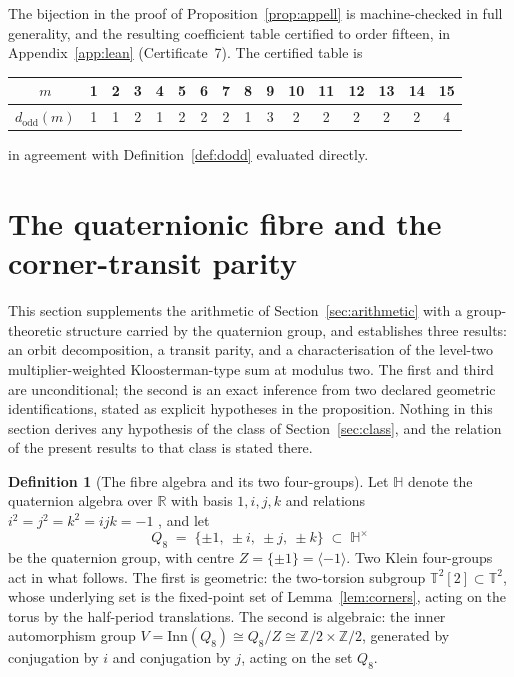 \documentclass[11pt,a4paper]{article}
\newcommand{\T}{\mathbb{T}}
\newcommand{\R}{\mathbb{R}}
\newcommand{\Z}{\mathbb{Z}}
\newcommand{\dodd}{d_{\mathrm{odd}}}
\theoremstyle{plain}
\theoremstyle{definition}
\newtheorem{definition}[theorem]{Definition}
\theoremstyle{remark}
\begin{document}
The bijection in the proof of Proposition~\ref{prop:appell} is machine-checked in full generality, and the resulting coefficient table certified to order fifteen, in Appendix~\ref{app:lean} (Certificate~7). The certified table is
\begin{center}
\begin{tabular}{c|ccccccccccccccc}
$m$ & 1 & 2 & 3 & 4 & 5 & 6 & 7 & 8 & 9 & 10 & 11 & 12 & 13 & 14 & 15 \\
\midrule
$\dodd(m)$ & 1 & 1 & 2 & 1 & 2 & 2 & 2 & 1 & 3 & 2 & 2 & 2 & 2 & 2 & 4
\end{tabular}
\end{center}
in agreement with Definition~\ref{def:dodd} evaluated directly.

\section{The quaternionic fibre and the corner-transit parity}\label{sec:parity}

This section supplements the arithmetic of Section~\ref{sec:arithmetic} with a group-theoretic structure carried by the quaternion group, and establishes three results: an orbit decomposition, a transit parity, and a characterisation of the level-two multiplier-weighted Kloosterman-type sum at modulus two. The first and third are unconditional; the second is an exact inference from two declared geometric identifications, stated as explicit hypotheses in the proposition. Nothing in this section derives any hypothesis of the class of Section~\ref{sec:class}, and the relation of the present results to that class is stated there.

\begin{definition}[The fibre algebra and its two
four-groups]\label{def:fibrealg} Let $\mathbb{H}$ denote the quaternion algebra over $\R$ with basis $1, i, j, k$ and relations $i^2 = j^2 = k^2 = ijk = -1$ \cite{ConwaySmith}, and let
\[
Q_8 \;=\; \{\pm 1,\ \pm i,\ \pm j,\ \pm k\} \;\subset\; \mathbb{H}^{\times}
\]
be the quaternion group, with centre $Z = \{\pm 1\} = \langle -1 \rangle$. Two Klein four-groups act in what follows. The first is geometric: the two-torsion subgroup $\T^2[2] \subset \T^2$, whose underlying set is the fixed-point set of Lemma~\ref{lem:corners}, acting on the torus by the half-period translations. The second is algebraic: the inner automorphism group $V = \mathrm{Inn}(Q_8) \cong Q_8/Z \cong \Z/2 \times \Z/2$, generated by conjugation by $i$ and conjugation by $j$, acting on the set $Q_8$.
\end{definition}
\end{document}
